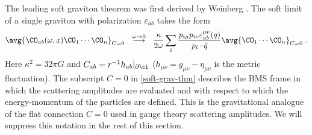 \documentclass[11pt]{article}
\def\o{{\omega}}
\def\ve{{\varepsilon}}
\def\p{{\partial}}
\begin{document}
The leading soft graviton theorem was first derived by Weinberg \cite{Weinberg:1965nx}. The soft limit of a single graviton with polarization $\varepsilon_{ab}$ takes the form
\begin{equation}
\begin{split}\label{soft-grav-thm}
\avg{ \CO_{ab} ( \o , x ) \CO_1 \cdots \CO_n }_{C=0}  ~~ \stackrel{\o\to0}{\longrightarrow} ~~   \frac{\kappa}{2\omega} \sum_i  \frac{ p_{i\mu} p_{i\nu} \ve^{\mu\nu}_{ab} (q)  }{ p_i \cdot \hat{q} } \avg{  \CO_1 \cdots \CO_n }_{C=0}  \; . 
\end{split}
\end{equation}
Here $\kappa^2=32\pi G$ and $C_{ab} = r^{-1} h_{ab} |_{\p \ci}$ ($h_{\mu\nu}=g_{\mu\nu}-\eta_{\mu\nu}$ is the metric fluctuation). The subscript $C=0$ in \eqref{soft-grav-thm} describes the BMS frame in which the scattering amplitudes are evaluated and with respect to which the energy-momentum of the particles are defined. This is the gravitational analogue of the flat connection $C = 0$ used in gauge theory scattering amplitudes. We will suppress this notation in the rest of this section.
\end{document}
